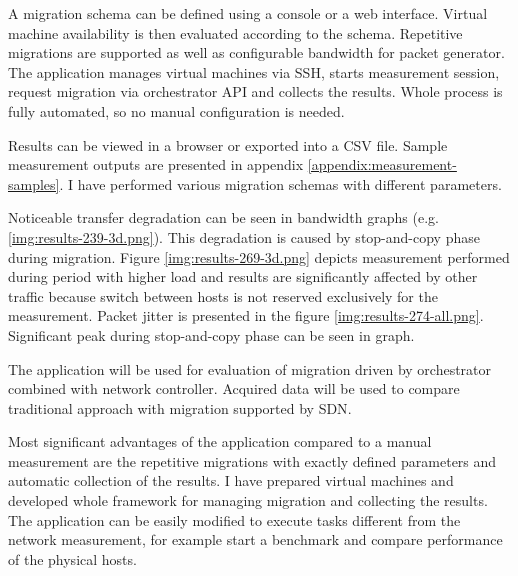 A migration schema can be defined using a console or a web interface. Virtual machine availability is then evaluated according to the schema. Repetitive migrations are supported as well as configurable bandwidth for packet generator. 
The application manages virtual machines via \Ac{SSH}, starts measurement session, request migration via orchestrator \Ac{API} and collects the results. Whole process is fully automated, so no manual configuration is needed. 

Results can be viewed in a browser or exported into a \Ac{CSV} file. Sample measurement outputs are presented in appendix \ref{appendix:measurement-samples}. I have performed various migration schemas with different parameters. 

Noticeable transfer degradation can be seen in bandwidth graphs (e.g. \ref{img:results-239-3d.png}). This degradation is caused by stop-and-copy phase during migration. Figure \ref{img:results-269-3d.png} depicts measurement performed during period with higher load and results are significantly affected by other traffic because switch between hosts is not reserved exclusively for the measurement. Packet jitter is presented in the figure \ref{img:results-274-all.png}. Significant peak during stop-and-copy phase can be seen in graph.

The application will be used for evaluation of migration driven by orchestrator combined with network controller. Acquired data will be used to compare traditional approach with migration supported by \Ac{SDN}. 

Most significant advantages of the application compared to a manual measurement are the repetitive migrations with exactly defined parameters and automatic collection of the results. 
I have prepared virtual machines and developed whole framework for managing migration and collecting the results. 
The application can be easily modified to execute tasks different from the network measurement, for example start a benchmark and compare performance of the physical hosts.
